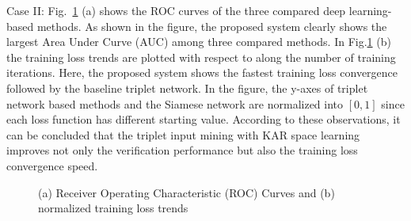 \documentclass{sig-alternate-05-2015}
\begin{document}
Case II: Fig.~\ref{fig2} (a) shows the ROC curves of the three compared deep learning-based methods. As shown in the figure, the proposed system clearly shows the largest Area Under Curve (AUC) among three compared methods. In Fig.\ref{fig2} (b) the training loss trends are plotted with respect to along the number of training iterations. Here, the proposed system shows the fastest training loss convergence followed by the baseline triplet network. In the figure, the y-axes of triplet network based methods and the Siamese network are normalized into $[0,1]$ since each loss function has different starting value. According to these observations, it can be concluded that the triplet input mining with KAR space learning improves not only the verification performance but also the training loss convergence speed.
\begin{figure}%
\centering
    \begin{center}
    \caption{(a) Receiver Operating Characteristic (ROC) Curves and 
    (b) normalized training loss trends}
    \label{fig2}
    \end{center}
 \end{figure}
\end{document}
